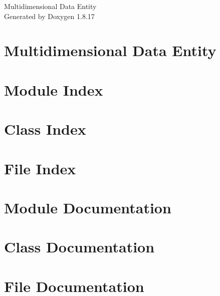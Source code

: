 \let\mypdfximage\pdfximage\def\pdfximage{\immediate\mypdfximage}\documentclass[twoside]{book}
\newcommand{\+}{\discretionary{\mbox{\scriptsize$\hookleftarrow$}}{}{}}
\newcommand{\clearemptydoublepage}{%
  \newpage{\pagestyle{empty}\cleardoublepage}%
}
\begin{document}
\hypersetup{pageanchor=false,
             bookmarksnumbered=true,
             pdfencoding=unicode
            }
\begin{titlepage}
\vspace*{7cm}
\begin{center}%
{\Large Multidimensional Data Entity }\\
\vspace*{1cm}
{\large Generated by Doxygen 1.8.17}\\
\end{center}
\end{titlepage}
\clearemptydoublepage
{}
\tableofcontents
\clearemptydoublepage
{}
\hypersetup{pageanchor=true}

\chapter{Multidimensional Data Entity}
\label{index}\hypertarget{index}{}
\chapter{Module Index}

\chapter{Class Index}

\chapter{File Index}

\chapter{Module Documentation}










\chapter{Class Documentation}








\chapter{File Documentation}



\backmatter
\newpage
{}
\clearemptydoublepage
{}
\printindex
\end{document}
